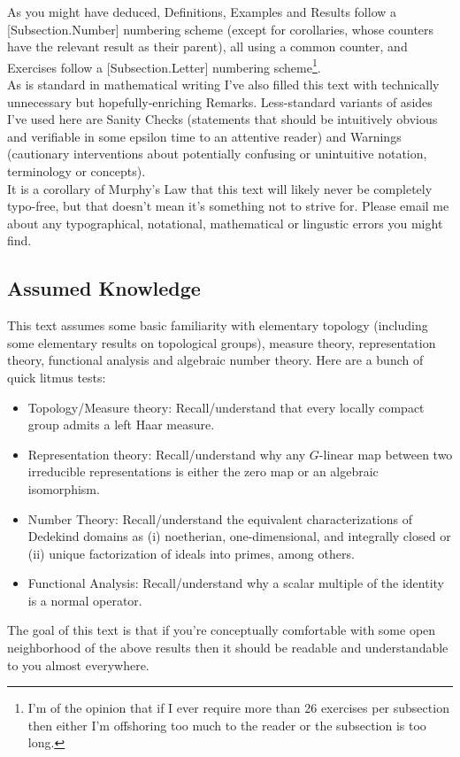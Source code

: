 \documentclass[11pt, x11names]{book}
\newcounter{exercises}
\begin{document}
As you might have deduced, Definitions, Examples and Results follow a [Subsection.Number] numbering scheme (except for corollaries, whose counters have the relevant result as their parent), all using a common counter, and Exercises follow a [Subsection.Letter] numbering scheme\footnote{I'm of the opinion that if I ever require more than 26 exercises per subsection then either I'm offshoring too much to the reader or the subsection is too long.}.\\

As is standard in mathematical writing I've also filled this text with technically unnecessary but hopefully-enriching Remarks. Less-standard variants of asides I've used here are Sanity Checks (statements that should be intuitively obvious and verifiable in some epsilon time to an attentive reader) and Warnings (cautionary interventions about potentially confusing or unintuitive notation, terminology or concepts).\\

It is a corollary of Murphy's Law that this text will likely never be completely typo-free, but that doesn't mean it's something not to strive for. Please email me about any typographical, notational, mathematical or lingustic errors you might find.

\newpage
\subsection*{Assumed Knowledge}

This text assumes some basic familiarity with elementary topology (including some elementary results on topological groups), measure theory, representation theory, functional analysis and algebraic number theory. Here are a bunch of quick litmus tests:
\begin{itemize}
    \item Topology/Measure theory: Recall/understand that every locally compact group admits a left Haar measure.
    \item Representation theory: Recall/understand why any $G$-linear map between two irreducible representations is either the zero map or an algebraic isomorphism.
    \item Number Theory: Recall/understand the equivalent characterizations of Dedekind domains as (i) noetherian, one-dimensional, and integrally closed or (ii) unique factorization of ideals into primes, among others.
    \item Functional Analysis: Recall/understand why a scalar multiple of the identity is a normal operator.
\end{itemize}
The goal of this text is that if you're conceptually comfortable with some open neighborhood of the above results then it should be readable and understandable to you almost everywhere.
\end{document}

